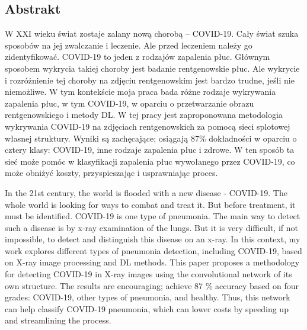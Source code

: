 \documentclass{article}
\begin{document}
\subsection{Abstrakt}
W XXI wieku świat zostaje zalany nową chorobą – COVID-19. Cały świat szuka sposobów na jej zwalczanie i leczenie. Ale przed leczeniem należy go zidentyfikować. COVID-19 to jeden z rodzajów zapalenia płuc. Głównym sposobem wykrycia takiej choroby jest badanie rentgenowskie płuc. Ale wykrycie i rozróżnienie tej choroby na zdjęciu rentgenowskim jest bardzo trudne, jeśli nie niemożliwe. W tym kontekście moja praca bada różne rodzaje wykrywania zapalenia płuc, w tym COVID-19, w oparciu o przetwarzanie obrazu rentgenowskiego i metody DL. W tej pracy jest zaproponowana metodologia wykrywania COVID-19 na zdjęciach rentgenowskich za pomocą sieci splotowej własnej struktury. Wyniki są zachęcające; osiągają 87\% dokładności w oparciu o cztery klasy: COVID-19, inne rodzaje zapalenia płuc i zdrowe. W ten sposób ta sieć może pomóc w klasyfikacji zapalenia płuc wywołanego przez COVID-19, co może obniżyć koszty, przyspieszając i usprawniając proces.\\

\vspace{0.4cm}

In the 21st century, the world is flooded with a new disease - COVID-19. The whole world is looking for ways to combat and treat it. But before treatment, it must be identified. COVID-19 is one type of pneumonia. The main way to detect such a disease is by x-ray examination of the lungs. But it is very difficult, if not impossible, to detect and distinguish this disease on an x-ray. In this context, my work explores different types of pneumonia detection, including COVID-19, based on X-ray image processing and DL methods. This paper proposes a methodology for detecting COVID-19 in X-ray images using the convolutional network of its own structure. The results are encouraging; achieve 87 \% accuracy based on four grades: COVID-19, other types of pneumonia, and healthy. Thus, this network can help classify COVID-19 pneumonia, which can lower costs by speeding up and streamlining the process.


\end{document}
